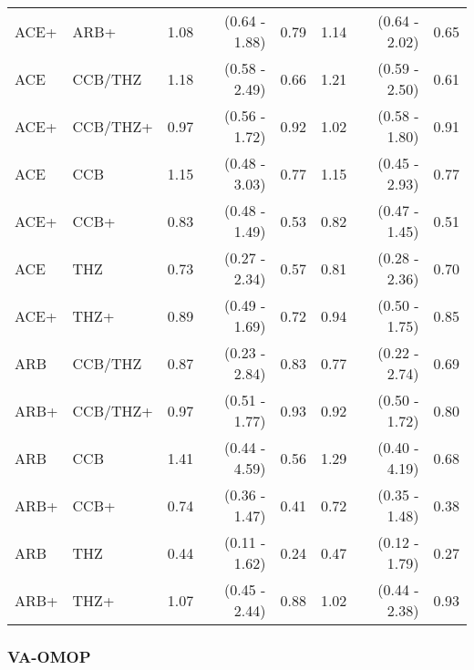\documentclass[11pt,]{article}
\begin{document}
\begin{table}[H]
{\begin{tabular}{llrrrrrr}
  ACE+ & ARB+ & 1.08 & (0.64 - 1.88) & 0.79 & 1.14 & (0.64 - 2.02) & 0.65 \\ 
  ACE & CCB/THZ & 1.18 & (0.58 - 2.49) & 0.66 & 1.21 & (0.59 - 2.50) & 0.61 \\ 
  ACE+ & CCB/THZ+ & 0.97 & (0.56 - 1.72) & 0.92 & 1.02 & (0.58 - 1.80) & 0.91 \\ 
  ACE & CCB & 1.15 & (0.48 - 3.03) & 0.77 & 1.15 & (0.45 - 2.93) & 0.77 \\ 
  ACE+ & CCB+ & 0.83 & (0.48 - 1.49) & 0.53 & 0.82 & (0.47 - 1.45) & 0.51 \\ 
  ACE & THZ & 0.73 & (0.27 - 2.34) & 0.57 & 0.81 & (0.28 - 2.36) & 0.70 \\ 
  ACE+ & THZ+ & 0.89 & (0.49 - 1.69) & 0.72 & 0.94 & (0.50 - 1.75) & 0.85 \\ 
  ARB & CCB/THZ & 0.87 & (0.23 - 2.84) & 0.83 & 0.77 & (0.22 - 2.74) & 0.69 \\ 
  ARB+ & CCB/THZ+ & 0.97 & (0.51 - 1.77) & 0.93 & 0.92 & (0.50 - 1.72) & 0.80 \\ 
  ARB & CCB & 1.41 & (0.44 - 4.59) & 0.56 & 1.29 & (0.40 - 4.19) & 0.68 \\ 
  ARB+ & CCB+ & 0.74 & (0.36 - 1.47) & 0.41 & 0.72 & (0.35 - 1.48) & 0.38 \\ 
  ARB & THZ & 0.44 & (0.11 - 1.62) & 0.24 & 0.47 & (0.12 - 1.79) & 0.27 \\ 
  ARB+ & THZ+ & 1.07 & (0.45 - 2.44) & 0.88 & 1.02 & (0.44 - 2.38) & 0.93 \\ 
    \bottomrule
  \end{tabular}
  }
\end{table}

\hypertarget{va-omop-3}{%
\subsubsection{VA-OMOP}\label{va-omop-3}}
\end{document}
